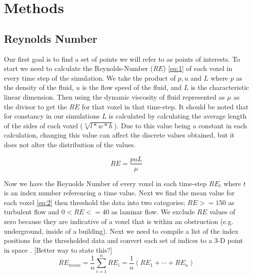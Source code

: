 
\chapter{Methods} %

\label{Chapter2} %


\section{Reynolds Number}

Our first goal is to find a set of points we will refer to as points of interests. To start we need to calculate the Reynolds-Number (\ensuremath{RE}) \ref{eq:1} of each voxel in every time step of the simulation. We take the product of \ensuremath{p,u} and \ensuremath{L} where \ensuremath{p} as the density of the fluid, \ensuremath{u} is the flow speed of the fluid, and \ensuremath{L} is the characteristic linear dimension. Then using the dynamic viscosity of fluid represented as $\mu$ as the divisor to get the \ensuremath{RE} for that voxel in that time-step. It should be noted that for constancy in our simulations \ensuremath{L} is calculated by calculating the average length of the sides of each voxel (\ensuremath{\sqrt[3]{l*w*h}}).  Due to this value being a constant in each calculation, changing this value can affect the discrete values obtained, but it does not alter the distribution of the values. 

\begin{equation}\label{eq:1}
RE  = \frac{puL} {\mu} 
\end{equation}

Now we have the Reynolds Number of every voxel in each time-step \ensuremath{RE_t} where \ensuremath{t} is an index number referencing a time value. Next we find the mean value for each voxel \ref{eq:2} then threshold the data into two categories; \ensuremath{RE>=150} as turbulent flow and \ensuremath{0<RE<=40} as laminar flow. We exclude \ensuremath{RE} values of zero because they are indicative of a voxel that is within an obstruction (e.g. underground, inside of a building). Next we need to compile a list of the index positions for the thresholded data and convert each set of indices to a 3-D point in space .
 \color{red} [Better way to state this?] \color{black} 
\begin{equation} \label{eq:2}
RE_{mean} = \frac{1}{n} \sum_{i=1}^{n} RE_{i}=\frac{1}{n}\left(RE_{1}+\cdots+RE_{n}\right)
\end{equation} 

